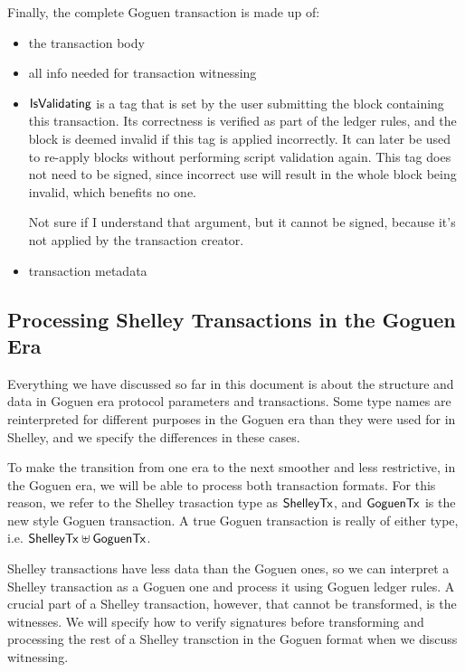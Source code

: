 Finally, the complete Goguen transaction is made up of:

\begin{itemize}
  \item the transaction body
  \item all info needed for transaction witnessing
  \item $\mathsf{IsValidating}$ is a tag that is
  set by the user submitting the block containing this transaction.
  Its correctness is verified as part of the ledger rules, and the block is
  deemed invalid if this tag is applied incorrectly.
  It can later be used to re-apply blocks without performing script validation
  again. This tag does not need to be signed, since incorrect use will result
  in the whole block being invalid, which benefits no one.
  \begin{note}
    Not sure if I understand that argument, but it cannot be signed,
    because it's not applied by the transaction creator.
  \end{note}
  \item transaction metadata
\end{itemize}

\subsection{Processing Shelley Transactions in the Goguen Era}
Everything we have discussed so far in this document is about the structure and data
in Goguen era protocol parameters and transactions. Some type names are reinterpreted
for different purposes in the Goguen era than they were used for in Shelley, and
we specify the differences in these cases.

To make the transition from one era to the next smoother and less restrictive,
in the Goguen era, we will be able to process both transaction formats.
For this reason, we refer to the Shelley
trasaction type as $\mathsf{ShelleyTx}$, and $\mathsf{GoguenTx}$ is the new style Goguen transaction.
A true Goguen transaction is really of either type,
i.e. $\mathsf{ShelleyTx} \uplus \mathsf{GoguenTx}$.

Shelley transactions have less data than the Goguen ones, so we can interpret
a Shelley transaction as a Goguen one and process it using Goguen ledger
rules. A crucial part of a Shelley transaction,
however, that cannot be transformed, is the witnesses.
We will specify how to verify signatures before transforming and processing
the rest of a Shelley transction in the Goguen format when we discuss witnessing.


